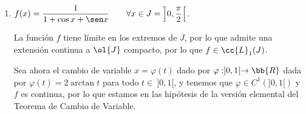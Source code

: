 \begin{ejercicio}
\begin{enumerate}
        Además, $\varphi\in C^1\left(\left]\nicefrac{\pi}{4},\nicefrac{\pi}{2}\right[\right)$, $\varphi\left(\left]\nicefrac{\pi}{4},\nicefrac{\pi}{2}\right[\right)=J$ y $\varphi'(t)\neq 0$ para todo $t\in \left]\nicefrac{\pi}{4},\nicefrac{\pi}{2}\right[$.
        Por tanto, estamos en las hipótesis del Teorema de Cambio de Variable, por lo que $f\in \cc{L}_1\left(\left]1,+\infty\right[\right)$ si, y sólo si, $(f\circ \varphi)\varphi'$ es integrable en $\left]\nicefrac{\pi}{4},\nicefrac{\pi}{2}\right[$.
        Tenemos que:
        \begin{equation*}
            (f\circ \varphi)(t)\cdot \varphi'(t) = \frac{1}{\tg^2(t)\cdot \sqrt{1+\tg^2(t)}}\cdot \frac{1}{\cos^2(t)}
            = \frac{1}{\sen^2(t)\cdot \sqrt{\frac{1}{\cos^2(t)}}}
            = \frac{\cos (t)}{\sen^2(t)}
        \end{equation*}

        La función obtenida tiene límite en $\nicefrac{\pi}{4}$ y $\nicefrac{\pi}{2}$, por lo que admite una extensión continua a $\left[\nicefrac{\pi}{4},\nicefrac{\pi}{2}\right]$,
        por lo que es integrable en $\left(\left]\nicefrac{\pi}{4},\nicefrac{\pi}{2}\right[\right)$. Por tanto, $(f\circ \varphi)\varphi'$ es integrable en $\left]\nicefrac{\pi}{4},\nicefrac{\pi}{2}\right[$, por lo que $f\in \cc{L}_1\left(J\right)$.

        Por el Teorema de Cambio de Variable, y posteriormente por la Regla de Barrow, tenemos que:
        \begin{align*}
            \int_1^{+\infty} \dfrac{1}{x^2\sqrt{1+x^2}}~dx
            =& \int_{\nicefrac{\pi}{4}}^{\nicefrac{\pi}{2}} \dfrac{\cos (t)}{\sen^2(t)}~dt
            = \left[-\frac{1}{\sen t}\right]_{\nicefrac{\pi}{4}}^{\nicefrac{\pi}{2}}
            =\\&= -\frac{1}{\sen\left(\nicefrac{\pi}{2}\right)} + \frac{1}{\sen\left(\nicefrac{\pi}{4}\right)}
            = \sqrt{2}-1
        \end{align*}


        \item $f(x)=\dfrac{1}{1+\cos x + \sen x} \qquad \forall x\in J=\left]0,\dfrac{\pi}{2}\right[$.
        
        La función $f$ tiene límite en los extremos de $J$, por lo que admite una extensión continua a $\ol{J}$ compacto, por lo que $f\in \cc{L}_1(J)$.

        Sea ahora el cambio de variable $x=\varphi(t)$ dado por $\varphi:]0,1[\to \bb{R}$ dada por $\varphi(t)=2\arctan t$ para todo $t\in~]0,1[$, y tenemos que $\varphi\in C^1(]0,1[)$ y $f$ es continua,
        por lo que estamos en las hipótesis de la versión elemental del Teorema de Cambio de Variable.
        

\end{enumerate}
\end{ejercicio}
